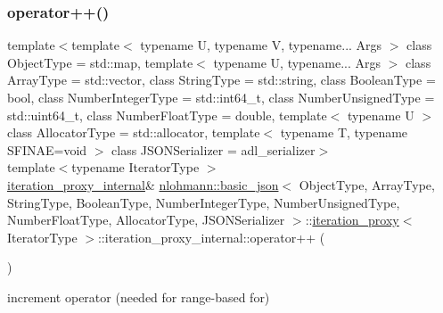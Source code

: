 \subsubsection{\texorpdfstring{operator++()}{operator++()}}
{\footnotesize\ttfamily template$<$template$<$ typename U, typename V, typename... Args $>$ class Object\+Type = std\+::map, template$<$ typename U, typename... Args $>$ class Array\+Type = std\+::vector, class String\+Type  = std\+::string, class Boolean\+Type  = bool, class Number\+Integer\+Type  = std\+::int64\+\_\+t, class Number\+Unsigned\+Type  = std\+::uint64\+\_\+t, class Number\+Float\+Type  = double, template$<$ typename U $>$ class Allocator\+Type = std\+::allocator, template$<$ typename T, typename S\+F\+I\+N\+A\+E=void $>$ class J\+S\+O\+N\+Serializer = adl\+\_\+serializer$>$ \\
template$<$typename Iterator\+Type $>$ \\
\hyperlink{classnlohmann_1_1basic__json_1_1iteration__proxy_1_1iteration__proxy__internal}{iteration\+\_\+proxy\+\_\+internal}\& \hyperlink{classnlohmann_1_1basic__json}{nlohmann\+::basic\+\_\+json}$<$ Object\+Type, Array\+Type, String\+Type, Boolean\+Type, Number\+Integer\+Type, Number\+Unsigned\+Type, Number\+Float\+Type, Allocator\+Type, J\+S\+O\+N\+Serializer $>$\+::\hyperlink{classnlohmann_1_1basic__json_1_1iteration__proxy}{iteration\+\_\+proxy}$<$ Iterator\+Type $>$\+::iteration\+\_\+proxy\+\_\+internal\+::operator++ (\begin{DoxyParamCaption}{ }\end{DoxyParamCaption})\hspace{0.3cm}{\ttfamily [inline]}}



increment operator (needed for range-\/based for) 

\mbox{\label{classnlohmann_1_1basic__json_1_1iteration__proxy_1_1iteration__proxy__internal_a1d1310beb3327c5c54c4bc1c4a1c62b8}} 
